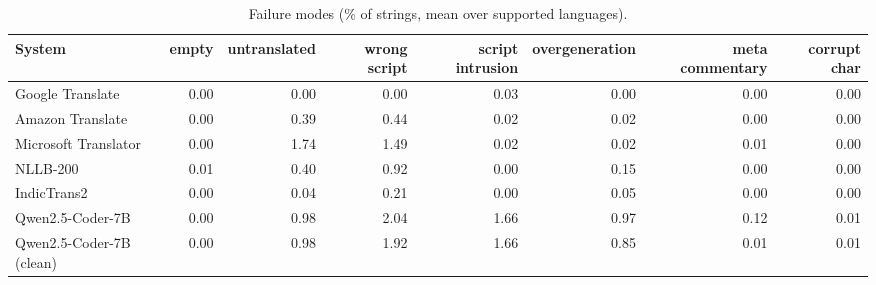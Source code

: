 \begin{table}[t]
\centering
\caption{Failure modes (\% of strings, mean over supported languages).\label{tab:failures}}
\begin{tabular}{lrrrrrrr}
\toprule
System & empty & untranslated & wrong script & script intrusion & overgeneration & meta commentary & corrupt char \\
\midrule
Google Translate & 0.00 & 0.00 & 0.00 & 0.03 & 0.00 & 0.00 & 0.00 \\
Amazon Translate & 0.00 & 0.39 & 0.44 & 0.02 & 0.02 & 0.00 & 0.00 \\
Microsoft Translator & 0.00 & 1.74 & 1.49 & 0.02 & 0.02 & 0.01 & 0.00 \\
NLLB-200 & 0.01 & 0.40 & 0.92 & 0.00 & 0.15 & 0.00 & 0.00 \\
IndicTrans2 & 0.00 & 0.04 & 0.21 & 0.00 & 0.05 & 0.00 & 0.00 \\
Qwen2.5-Coder-7B & 0.00 & 0.98 & 2.04 & 1.66 & 0.97 & 0.12 & 0.01 \\
Qwen2.5-Coder-7B (clean) & 0.00 & 0.98 & 1.92 & 1.66 & 0.85 & 0.01 & 0.01 \\
\bottomrule
\end{tabular}
\end{table}

